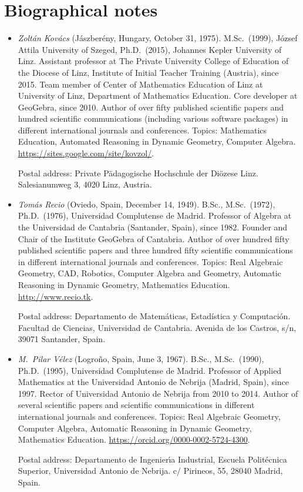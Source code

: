 \documentclass{article}
\begin{document}
\section*{Biographical notes}

\begin{itemize}

\item
\textit{Zolt\'an Kov\'acs} (J\'aszber\'eny, Hungary, October 31, 1975). M.Sc.~(1999),
J\'ozsef Attila University of Szeged,
Ph.D.~(2015), Johannes Kepler University of Linz. Assistant professor at
The Private University College of Education of the Diocese of Linz, Institute of Initial Teacher Training (Austria),
since 2015.
Team member of Center of Mathematics Education of Linz at University of Linz, Department of Mathematics Education.
Core developer at GeoGebra, since 2010.
Author of over fifty published scientific papers and hundred scientific
communications (including various software packages) in different international journals and conferences.
Topics: Mathematics Education, Automated Reasoning in Dynamic Geometry, Computer Algebra.
\url{https://sites.google.com/site/kovzol/}.

Postal address: Private P\"adagogische Hochschule der Di\"ozese Linz.
Salesianumweg 3, 4020 Linz, Austria.

\item
\textit{Tom\'as Recio} (Oviedo, Spain, December 14, 1949).  B.Sc., M.Sc.~(1972),
Ph.D.~(1976), Universidad Complutense de Madrid. Professor of Algebra
at the Universidad de Cantabria (Santander, Spain), since 1982. Founder
and Chair of the Institute GeoGebra of Cantabria.
Author of over hundred
fifty published scientific papers and three hundred fifty scientific
communications in different international journals and conferences.
Topics: Real Algebraic Geometry, CAD, Robotics, Computer Algebra and
Geometry,  Automatic Reasoning in Dynamic Geometry, Mathematics
Education. \url{http://www.recio.tk}.

Postal address: Departamento de Matem\'aticas, Estadística y Computaci\'on.
Facultad de Ciencias, Universidad de Cantabria. Avenida de los Castros, s/n,
39071 Santander, Spain.

\item
\textit{M.~Pilar V\'elez} (Logro\~no, Spain, June 3, 1967).  B.Sc., M.Sc.~(1990),
Ph.D.~(1995), Universidad Complutense de Madrid. Professor of Applied
Mathematics at the Universidad Antonio de Nebrija (Madrid, Spain), since
1997. Rector of Universidad Antonio de Nebrija from 2010 to 2014. 
Author of several scientific papers and scientific communications in different
international journals and conferences. Topics: Real Algebraic Geometry, Computer Algebra, 
Automatic Reasoning in Dynamic Geometry, Mathematics Education. \url{https://orcid.org/0000-0002-5724-4300}.

Postal address: Departamento de Ingenier\'{\i}a Industrial,
Escuela Polit\'ecnica Superior, Universidad Antonio de Nebrija.
c/ Pirineos, 55, 28040 Madrid, Spain.

\end{itemize}



\end{document}
